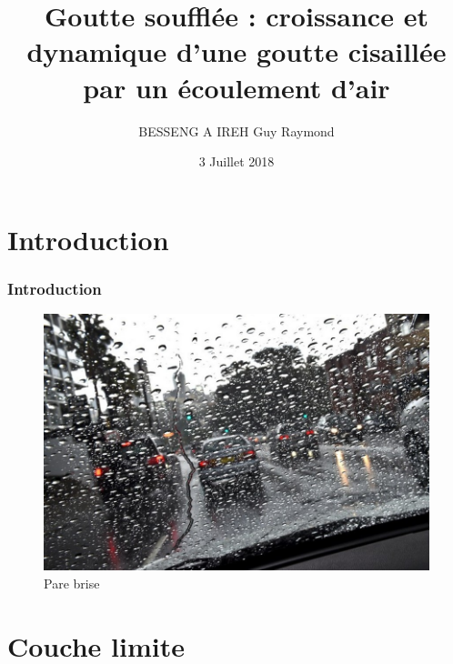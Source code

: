 \documentclass{beamer}
\title[Goutte soufflée]{Goutte soufflée : croissance et dynamique d'une goutte cisaillée par un écoulement d'air\xspace}
\author{BESSENG A IREH Guy Raymond}
\institute[]{Université Paul Sabatier}
\date{3 Juillet 2018}
\begin{document}
\maketitle
\section{Introduction}\label{sec:introduction}
\begin{frame}
\frametitle{Introduction}
	\begin{figure}
		\centering
		\includegraphics[width=0.8\linewidth]
	{./image/un-pare-brise-illustration.jpg}
	\caption{Pare brise}
\end{figure}
\end{frame}


\section{Couche limite}\label{sec:couche}
\end{document}
